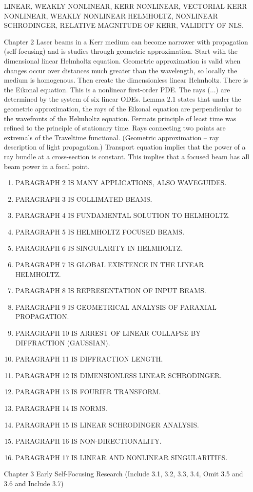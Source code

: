 LINEAR, WEAKLY NONLINEAR, KERR NONLINEAR, VECTORIAL KERR NONLINEAR, WEAKLY NONLINEAR HELMHOLTZ, NONLINEAR SCHRODINGER, RELATIVE MAGNITUDE OF KERR, VALIDITY OF NLS.



Chapter 2
Laser beams in a Kerr medium can become narrower with propagation (self-focusing) and is studies through geometric approximation. Start with the dimensional linear Helmholtz equation. Geometric approximation is valid when changes occur over distances much greater than the wavelength, so locally the medium is homogenous. Then create the dimensionless linear Helmholtz. There is the Eikonal equation. This is a nonlinear first-order PDE. The rays (...) are determined by the system of six linear ODEs. Lemma 2.1 states that under the geometric approximation, the rays of the Eikonal equation are perpendicular to the wavefronts of the Helmholtz equation. Fermats principle of least time was refined to the principle of stationary time. Rays connecting two points are extremals of the Traveltime functional. (Geometric approximation -- ray description of light propagation.) Transport equation implies that the power of a ray bundle at a cross-section is constant. This implies that a focused beam has all beam power in a focal point.

\begin{enumerate}
\item PARAGRAPH 2 IS MANY APPLICATIONS, ALSO WAVEGUIDES.
\item PARAGRAPH 3 IS COLLIMATED BEAMS.
\item PARAGRAPH 4 IS FUNDAMENTAL SOLUTION TO HELMHOLTZ.
\item PARAGRAPH 5 IS HELMHOLTZ FOCUSED BEAMS.
\item PARAGRAPH 6 IS SINGULARITY IN HELMHOLTZ.
\item PARAGRAPH 7 IS GLOBAL EXISTENCE IN THE LINEAR HELMHOLTZ.
\item PARAGRAPH 8 IS REPRESENTATION OF INPUT BEAMS.
\item PARAGRAPH 9 IS GEOMETRICAL ANALYSIS OF PARAXIAL PROPAGATION.
\item PARAGRAPH 10 IS ARREST OF LINEAR COLLAPSE BY DIFFRACTION (GAUSSIAN).
\item PARAGRAPH 11 IS DIFFRACTION LENGTH.
\item PARAGRAPH 12 IS DIMENSIONLESS LINEAR SCHRODINGER.
\item PARAGRAPH 13 IS FOURIER TRANSFORM.
\item PARAGRAPH 14 IS NORMS.
\item PARAGRAPH 15 IS LINEAR SCHRODINGER ANALYSIS.
\item PARAGRAPH 16 IS NON-DIRECTIONALITY.
\item PARAGRAPH 17 IS LINEAR AND NONLINEAR SINGULARITIES.
\end{enumerate}

Chapter 3
Early Self-Focusing Research (Include 3.1, 3.2, 3.3, 3.4, Omit 3.5 and 3.6 and Include 3.7)
